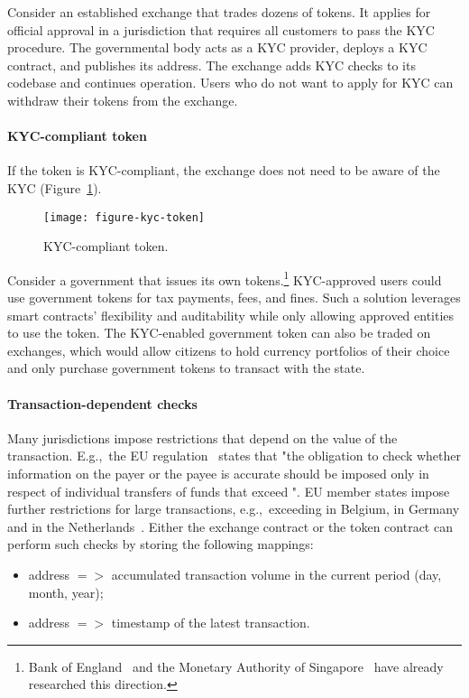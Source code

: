 Consider an established exchange that trades dozens of tokens.
It applies for official approval in a jurisdiction that requires all customers to pass the KYC procedure.
The governmental body acts as a KYC provider, deploys a KYC contract, and publishes its address.
The exchange adds KYC checks to its codebase and continues operation.
Users who do not want to apply for KYC can withdraw their tokens from the exchange.


\paragraph{KYC-compliant token}

If the token is KYC-compliant, the exchange does not need to be aware of the KYC (Figure~\ref{fig:KYCCompliantToken}).

\begin{figure}[h]
	\centering
	\texttt{[image: figure-kyc-token]}
	\caption{KYC-compliant token.}
	\label{fig:KYCCompliantToken}
\end{figure}

Consider a government that issues its own tokens.\footnote{Bank of England~\cite{Danezis2016} and the Monetary Authority of Singapore~\cite{Singapore17} have already researched this direction.}
KYC-approved users could use government tokens for tax payments, fees, and fines.
Such a solution leverages smart contracts' flexibility and auditability while only allowing approved entities to use the token.
The KYC-enabled government token can also be traded on exchanges, which would allow citizens to hold currency portfolios of their choice and only purchase government tokens to transact with the state.

\paragraph{Transaction-dependent checks}

Many jurisdictions impose restrictions that depend on the value of the transaction.
E.g.,~the EU regulation~\cite{EU847} states that "the obligation to check whether information on the payer or the payee is accurate should \textelp{} be imposed only in respect of individual transfers of funds that exceed ".
EU member states impose further restrictions for large transactions, e.g.,~exceeding  in Belgium,  in Germany and in the Netherlands~\cite{PWC2015}.
Either the exchange contract or the token contract can perform such checks by storing the following mappings:
\begin{itemize}
	\item address $=>$ accumulated transaction volume in the current period (day, month, year);
	\item address $=>$ timestamp of the latest transaction. 
\end{itemize}



